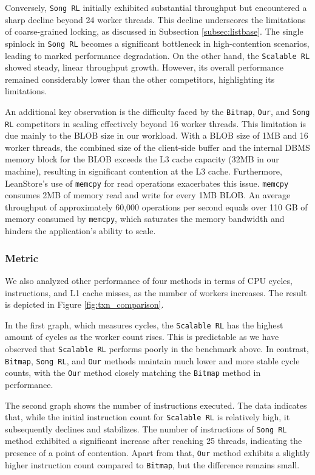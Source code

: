 Conversely, \texttt{Song RL} initially exhibited substantial throughput but encountered a sharp decline beyond 24 worker threads. 
This decline underscores the limitations of coarse-grained locking, as discussed in Subsection \ref{subsec:listbase}. 
The single spinlock in \texttt{Song RL} becomes a significant bottleneck in high-contention scenarios, leading to marked performance degradation. 
On the other hand, the \texttt{Scalable RL} showed steady, linear throughput growth. 
However, its overall performance remained considerably lower than the other competitors, highlighting its limitations.

An additional key observation is the difficulty faced by the \texttt{Bitmap}, \texttt{Our}, and \texttt{Song RL} competitors in scaling effectively beyond 16 worker threads. 
This limitation is due mainly to the BLOB size in our workload. With a BLOB size of 1MB and 16 worker threads, the combined size of the client-side buffer and the internal DBMS memory block for the BLOB exceeds the L3 cache capacity (32MB in our machine), resulting in significant contention at the L3 cache. 
Furthermore, LeanStore's use of \texttt{memcpy} for read operations exacerbates this issue. \texttt{memcpy} consumes 2MB of memory read and write for every 1MB BLOB. 
An average throughput of approximately 60,000 operations per second equals over 110 GB of memory consumed by \texttt{memcpy}, which saturates the memory bandwidth and hinders the application's ability to scale.

\subsubsection*{Metric}

We also analyzed other performance of four methods in terms of CPU cycles, instructions, and L1 cache misses, as the number of workers increases. The result is depicted in Figure \ref{fig:txn_comparison}. 

In the first graph, which measures cycles, the \texttt{Scalable RL} has the highest amount of cycles as the worker count rises. 
This is predictable as we have observed that \texttt{Scalable RL} performs poorly in the benchmark above. 
In contrast, \texttt{Bitmap}, \texttt{Song RL}, and \texttt{Our} methods maintain much lower and more stable cycle counts, with the \texttt{Our} method closely matching the \texttt{Bitmap} method in performance. 

The second graph shows the number of instructions executed. 
The data indicates that, while the initial instruction count for \texttt{Scalable RL} is relatively high, it subsequently declines and stabilizes. 
The number of instructions of \texttt{Song RL} method exhibited a significant increase after reaching 25 threads, indicating the presence of a point of contention.
Apart from that, \texttt{Our} method exhibits a slightly higher instruction count compared to \texttt{Bitmap}, but the difference remains small. 

